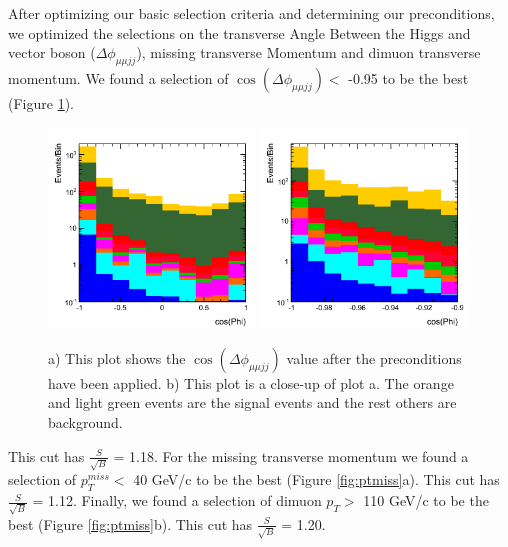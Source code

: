 \documentclass[12pt]{article}
\begin{document}
After optimizing our basic selection criteria and determining our preconditions, 
we optimized the selections on the transverse Angle Between the Higgs and vector boson ($\Delta\phi_{\mu\mu jj}$), 
missing transverse Momentum and dimuon transverse momentum. 
We found a selection of $\cos(\Delta\phi_{\mu\mu jj})<$ -0.95 to be the best (Figure \ref{fig:cosPhi}).
\begin{figure}[!hbtp]
\begin{center}
    \includegraphics[width=0.49\textwidth]{images/Hist_MuMu2JetPhiBeforeCuts.png} %
    \includegraphics[width=0.49\textwidth]{images/Hist_MuMu2JetPhiZoomB4Cut.png}
    \caption{ \label{fig:cosPhi}
         a) This plot shows the $\cos(\Delta\phi_{\mu\mu jj})$ value after the preconditions have been applied. b) This plot is a close-up of plot a.
	 The orange and light green events are the signal events and the rest others are background.
      }
\end{center}
\end{figure} 
This cut has $\frac{S}{\sqrt{B}}$ = 1.18. For the missing transverse momentum we found a selection of 
$p_{T}^{miss} <$ 40 GeV/c to be the best (Figure \ref{fig:ptmiss}a).
This cut has $\frac{S}{\sqrt{B}}$ = 1.12. Finally, we found a selection of dimuon $p_{T} >$ 110 GeV/c to be the best 
(Figure \ref{fig:ptmiss}b). This cut has $\frac{S}{\sqrt{B}}$ = 1.20. 
\end{document}
